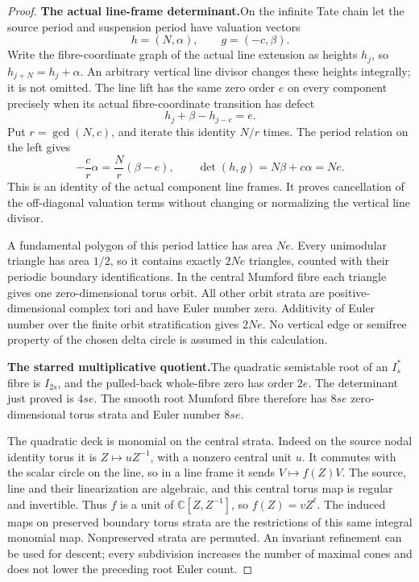 \begin{proof}
\par\medskip\noindent\textbf{The actual line-frame determinant.}\enspace On the infinite
Tate chain let the source period and suspension period have
valuation vectors
\[
                    h=(N,\alpha),\qquad g=(-c,\beta).
\]
Write the fibre-coordinate graph of the actual line extension
as heights \(h_j\), so \(h_{j+N}=h_j+\alpha\).
An arbitrary vertical line divisor changes these heights
integrally; it is not omitted.  The line lift has the same
zero order \(e\) on every component precisely when its
actual fibre-coordinate transition has defect
\[
                      h_j+\beta-h_{j-c}=e.             \tag{P3K.20.1}
\]
Put \(r=\gcd(N,c)\), and iterate this identity \(N/r\)
times.  The period relation on the left gives
\[
      -\frac c r\alpha=\frac N r(\beta-e),
      \qquad
      \det(h,g)=N\beta+c\alpha=Ne.                    \tag{P3K.20.2}
\]
This is an identity of the actual component line frames.
It proves cancellation of the off-diagonal valuation terms
without changing or normalizing the vertical line divisor.

A fundamental polygon of this period lattice has area
\(Ne\).  Every unimodular triangle has area \(1/2\),
so it contains exactly \(2Ne\) triangles, counted with
their periodic boundary identifications.  In the central
Mumford fibre each triangle gives one zero-dimensional
torus orbit.  All other orbit strata are positive-dimensional
complex tori and have Euler number zero.  Additivity of
Euler number over the finite orbit stratification gives
\(2Ne\).  No vertical edge or semifree property of the
chosen delta circle is assumed in this calculation.

\par\medskip\noindent\textbf{The starred multiplicative quotient.}\enspace The quadratic
semistable root of an \(I_s^*\) fibre is \(I_{2s}\),
and the pulled-back whole-fibre zero has order \(2e\).
The determinant just proved is \(4se\).  The smooth
root Mumford fibre therefore has \(8se\) zero-dimensional
torus strata and Euler number \(8se\).

The quadratic deck is monomial on the central strata.
Indeed on the source nodal identity torus it is
\(Z\mapsto uZ^{-1}\), with a nonzero central unit
\(u\).  It commutes with the scalar circle on the line,
so in a line frame it sends \(V\mapsto f(Z)V\).
The source, line and their linearization are algebraic,
and this central torus map is regular and invertible.
Thus \(f\) is a unit of \(\mathbb C[Z,Z^{-1}]\),
so \(f(Z)=vZ^{\ell}\).  The induced maps on preserved
boundary torus strata are the restrictions of this same
integral monomial map.  Nonpreserved strata are permuted.
An invariant refinement can be used for descent; every
subdivision increases the number of maximal cones and
does not lower the preceding root Euler count.


\end{proof}
